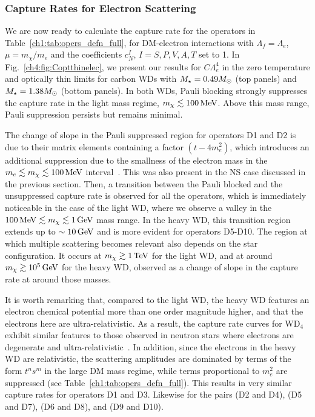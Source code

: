 \subsubsection{Capture Rates for Electron Scattering}
\label{ch4:subsubsec:resutls_capture_WD}

We are now ready to calculate the capture rate for the operators in Table~\ref{ch1:tab:opers_defn_full}, for DM-electron interactions with $\Lambda_f=\Lambda_e$, $\mu=m_\chi/m_e$ and the coefficients $c_N^I$, $I=S, P,V,A,T$ set to 1.
In Fig.~\ref{ch4:fig:Coptthinelec}, we present our results for $C\Lambda_e^4$ in the zero temperature and optically thin limits for carbon WDs with $M_\star=0.49M_\odot$ (top panels) and  $M_\star=1.38M_\odot$ (bottom panels). In both WDs, Pauli blocking strongly suppresses the capture rate in the light mass regime,  $m_\chi\lesssim 100{\rm \,MeV}$. Above this mass range, Pauli suppression persists but remains minimal.  

The change of slope in the Pauli suppressed region for operators D1 and D2 is due to their matrix elements containing a factor $(t-4m_e^2)$, which introduces an additional suppression due to the smallness of the electron mass in the $m_e\lesssim m_\chi\lesssim100{\rm \,MeV}$ interval~\cite{Bell:2020lmm_mar_ImprovedTreatmentDark}. This was also present in the NS case discussed in the previous section. 
Then, a transition between the Pauli blocked and the unsuppressed capture rate is observed for all the operators, which is immediately noticeable in the case of the light WD, where we observe a valley  in the  $100{\rm \,MeV}\lesssim m_\chi\lesssim1{\rm \,GeV}$ mass range. In the heavy WD, this transition region extends up to $\sim10{\rm \,GeV}$ and is more evident for operators D5-D10. 
The region at which multiple scattering becomes relevant also depends on the star configuration.  It occurs at $m_\chi\gtrsim1{\rm \,TeV}$ for the light WD, and at around  $m_\chi\gtrsim10^5{\rm \,GeV}$ for the heavy WD, observed as a change of slope in the capture rate at around those masses. 

It is worth remarking that, compared to the light WD, the heavy WD features an electron chemical potential more than one order magnitude higher, and that the electrons here are ultra-relativistic. As a result, the capture rate curves for WD$_4$ exhibit similar features to those observed in neutron stars where electrons are degenerate and ultra-relativistic~\cite{Bell:2020lmm_mar_ImprovedTreatmentDark}. In addition, since the electrons in the heavy WD are relativistic, the scattering amplitudes are dominated by terms of the form $t^ns^m$  in the large DM mass regime, while terms proportional to $m_e^2$ are suppressed (see Table~\ref{ch1:tab:opers_defn_full}). This results in very similar capture rates for operators D1 and D3. Likewise for the pairs (D2 and D4), (D5 and D7), (D6 and D8), and (D9 and D10).  

